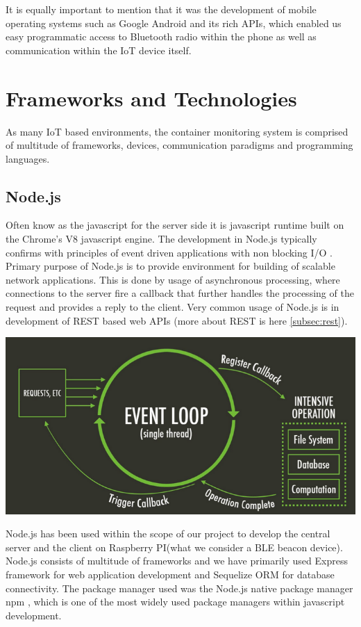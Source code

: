 \bigskip

It is equally important to mention that it was the development of mobile operating systems such as Google Android \citep{android} and its rich APIs, which enabled us easy programmatic access to Bluetooth radio within the phone as well as communication within the IoT device itself.


\section{Frameworks and Technologies}
\label{sec:fram-techn}

As many IoT based environments, the container monitoring system is comprised of multitude of frameworks, devices, communication paradigms and programming languages.

\subsection{Node.js}
\label{subsec:Node}

Often know as the javascript for the server side it is javascript runtime built on the Chrome's V8 javascript engine. The development in Node.js typically confirms with principles of event driven applications with non blocking I/O \citep{nodejs}. Primary purpose of Node.js is to provide environment for building of scalable network applications. This is done by usage of asynchronous processing, where connections to the server fire a callback that further handles the processing of the request and provides a reply to the client. Very common usage of Node.js is in development of REST based web APIs (more about REST is here \autoref{subsec:rest}).

\bigskip
\includegraphics[scale=0.3]{gfx/node} 
\bigskip

Node.js has been used within the scope of our project to develop the central server and the client on Raspberry PI(what we consider a BLE beacon device). Node.js consists of multitude of frameworks and we have primarily used Express framework for web application development and Sequelize ORM for database connectivity. The package manager used was the Node.js native package manager npm \citep{npm}, which is one of the most widely used package managers within javascript development.

